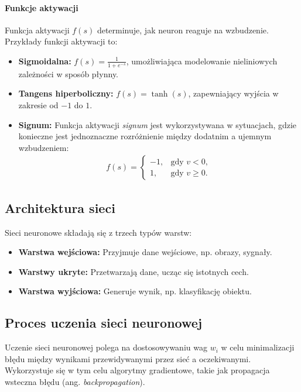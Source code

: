 \documentclass[a4paper,twoside,12pt]{book}
\begin{document}
\paragraph{Funkcje aktywacji}
\cite{bib:fujarewicz} Funkcja aktywacji \(f(s)\) determinuje, jak neuron reaguje na wzbudzenie. Przykłady funkcji aktywacji to:
\begin{itemize}
    \item \textbf{Sigmoidalna:} \(f(s) = \frac{1}{1 + e^{-s}}\), umożliwiająca modelowanie nieliniowych zależności w sposób płynny.
    \item \textbf{Tangens hiperboliczny:} \(f(s) = \tanh(s)\), zapewniający wyjścia w zakresie od \(-1\) do \(1\).
    \item \textbf{Signum:} Funkcja aktywacji \textit{signum} jest wykorzystywana w sytuacjach, gdzie konieczne jest jednoznaczne rozróżnienie między dodatnim a ujemnym wzbudzeniem:
    \begin{align}
        f(s) =
        \begin{cases} 
            -1, & \text{gdy } v < 0, \\
             1, & \text{gdy } v \geq 0.
        \end{cases}
    \end{align}
\end{itemize}

\newpage

\subsection{Architektura sieci}
Sieci neuronowe składają się z trzech typów warstw:
\begin{itemize}
    \item \textbf{Warstwa wejściowa:} Przyjmuje dane wejściowe, np. obrazy, sygnały.
    \item \textbf{Warstwy ukryte:} Przetwarzają dane, ucząc się istotnych cech.
    \item \textbf{Warstwa wyjściowa:} Generuje wynik, np. klasyfikację obiektu.
\end{itemize}

\subsection{Proces uczenia sieci neuronowej}
Uczenie sieci neuronowej polega na dostosowywaniu wag \(w_i\) w celu minimalizacji błędu między wynikami przewidywanymi przez sieć a oczekiwanymi. Wykorzystuje się w tym celu algorytmy gradientowe, takie jak propagacja wsteczna błędu (ang. \textit{backpropagation}).
\end{document}
